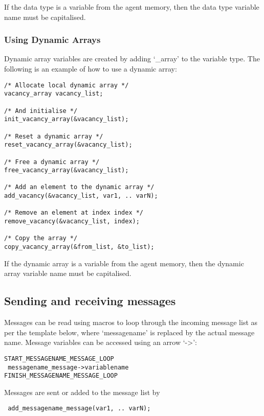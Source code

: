 If the data type is a variable from the agent memory, then the data type
variable name must be capitalised.

\subsubsection{Using Dynamic Arrays}

Dynamic array variables are created by adding `\_array' to the variable type.
The following is an example of how to use a dynamic array:

\begin{mylisting}
\begin{verbatim}
/* Allocate local dynamic array */
vacancy_array vacancy_list;

/* And initialise */
init_vacancy_array(&vacancy_list);

/* Reset a dynamic array */
reset_vacancy_array(&vacancy_list);

/* Free a dynamic array */
free_vacancy_array(&vacancy_list);

/* Add an element to the dynamic array */
add_vacancy(&vacancy_list, var1, .. varN);

/* Remove an element at index index */
remove_vacancy(&vacancy_list, index);

/* Copy the array */
copy_vacancy_array(&from_list, &to_list);
\end{verbatim}
\end{mylisting}

If the dynamic array is a variable from the agent memory, then the dynamic
array variable name must be capitalised.

\subsection{Sending and receiving messages}

Messages can be read using macros to loop through the incoming message list as
per the template below, where `messagename' is replaced by the actual message
name. Message variables can be accessed using an arrow `->':

\begin{mylisting}
\begin{verbatim}
START_MESSAGENAME_MESSAGE_LOOP
 messagename_message->variablename
FINISH_MESSAGENAME_MESSAGE_LOOP
\end{verbatim}
\end{mylisting}

Messages are sent or added to the message list by
\begin{mylisting}
\begin{verbatim}
 add_messagename_message(var1, .. varN);
\end{verbatim}
\end{mylisting}
